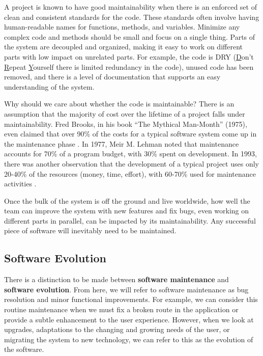 A project is known to have good maintainability when there is an enforced set of clean and consistent standards for the code. These standards often involve having human-readable names for functions, methods, and variables. Minimize any complex code and methods should be small and focus on a single thing. Parts of the system are decoupled and organized, making it easy to work on different parts with low impact on unrelated parts. For example, the code is DRY (\underline{D}on't \underline{R}epeat \underline{Y}ourself \textemdash there is limited redundancy in the code), unused code has been removed, and there is a level of documentation that supports an easy understanding of the system.


Why should we care about whether the code is maintainable? There is an assumption that the majority of cost over the lifetime of a project falls under maintainability. Fred Brooks, in his book ``The Mythical Man-Month'' (1975), even claimed that over 90\% of the costs for a typical software system come up in the maintenance phase \cite{brooks:mythical}. In 1977, Meir M. Lehman noted that maintenance accounts for 70\% of a program budget, with 30\% spent on development. In 1993, there was another observation that the development of a typical project uses only 20-40\% of the resources (money, time, effort), with 60-70\% used for maintenance activities \cite{ieee:1219}.

Once the bulk of the system is off the ground and live worldwide, how well the team can improve the system with new features and fix bugs, even working on different parts in parallel, can be impacted by its maintainability. Any successful piece of software will inevitably need to be maintained.

\subsection{Software Evolution} \label{subSoftwareEvolution}

There is a distinction to be made between \textbf{software maintenance} and \textbf{software evolution}. From here, we will refer to software maintenance as bug resolution and minor functional improvements. For example, we can consider this routine maintenance when we must fix a broken route in the application or provide a subtle enhancement to the user experience. However, when we look at upgrades, adaptations to the changing and growing needs of the user, or migrating the system to new technology, we can refer to this as the evolution of the software.

